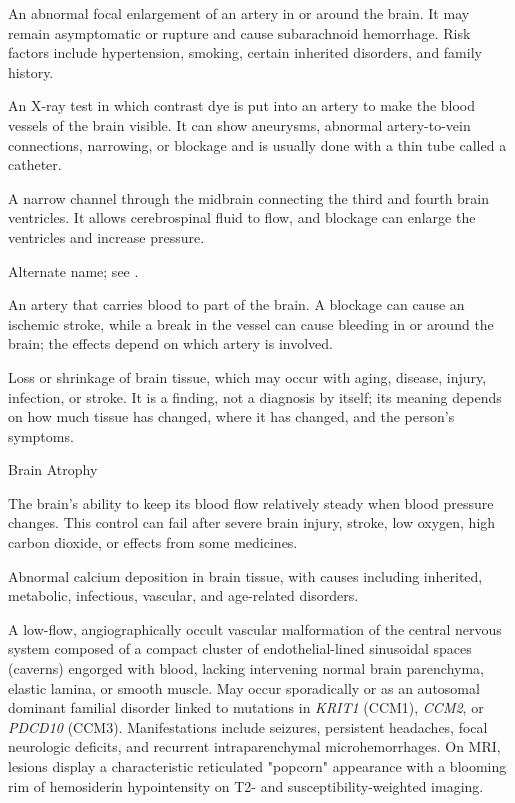  An abnormal focal enlargement of an artery in or around the brain. It may remain
asymptomatic or rupture and cause subarachnoid hemorrhage. Risk factors include hypertension, smoking, certain inherited
disorders, and family history.

 An X-ray test in which contrast dye is put into an artery to make the blood vessels of the brain visible. It can show aneurysms, abnormal artery-to-vein connections, narrowing, or blockage and is usually done with a thin tube called a catheter.

 A narrow channel through the midbrain connecting the third and fourth brain ventricles. It allows cerebrospinal fluid to flow, and blockage can enlarge the ventricles and increase pressure.

 Alternate name; see .

 An artery that carries blood to part of the brain. A blockage can cause an ischemic stroke, while a break in the vessel can cause bleeding in or around the brain; the effects depend on which artery is involved.

 Loss or shrinkage of brain tissue, which may occur with aging, disease, injury, infection, or stroke. It is a finding, not a diagnosis by itself; its meaning depends on how much tissue has changed, where it has changed, and the person's symptoms.

\synonyms
Brain Atrophy

 The brain's ability to keep its blood flow relatively steady when blood pressure changes. This control can fail after severe brain injury, stroke, low oxygen, high carbon dioxide, or effects from some medicines.

 Abnormal calcium deposition in brain tissue, with causes including inherited, metabolic, infectious, vascular, and age-related disorders.

 A low-flow, angiographically occult vascular malformation of the central nervous system composed of a compact cluster of endothelial-lined sinusoidal spaces (caverns) engorged with blood, lacking intervening normal brain parenchyma, elastic lamina, or smooth muscle. May occur sporadically or as an autosomal dominant familial disorder linked to mutations in \textit{KRIT1} (CCM1), \textit{CCM2}, or \textit{PDCD10} (CCM3). Manifestations include seizures, persistent headaches, focal neurologic deficits, and recurrent intraparenchymal microhemorrhages. On MRI, lesions display a characteristic reticulated "popcorn" appearance with a blooming rim of hemosiderin hypointensity on T2- and susceptibility-weighted imaging.

